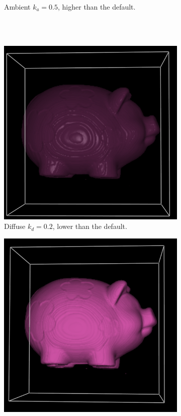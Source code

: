 \documentclass[a4paper]{article}
\begin{document}
\begin{figure}[h]
\begin{subfigure}[b]{0.45\textwidth}
    \caption{Ambient $k_a=0.5$, higher than the default.}
  \end{subfigure}
  \\~\\
  \begin{subfigure}[b]{0.45\textwidth}
    \centering
    \includegraphics[width=\textwidth]{pig8-phong-diffuse02}
    \caption{Diffuse $k_d=0.2$, lower than the default.}
  \end{subfigure}
  \hfill
  \begin{subfigure}[b]{0.45\textwidth}
    \centering
    \includegraphics[width=\textwidth]{pig8-phong-specular0}

\end{subfigure}
\end{figure}
\end{document}
